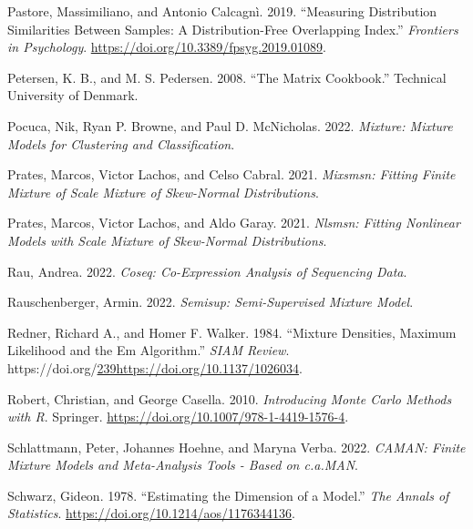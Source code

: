 \begin{CSLReferences}{1}{0}
\leavevmode{}%
Pastore, Massimiliano, and Antonio Calcagnì. 2019. {``Measuring {Distribution Similarities Between Samples}: {A Distribution-Free Overlapping Index}.''} \emph{Frontiers in Psychology}. \url{https://doi.org/10.3389/fpsyg.2019.01089}.

\leavevmode{}%
Petersen, K. B., and M. S. Pedersen. 2008. {``The Matrix Cookbook.''} Technical University of Denmark.

\leavevmode{}%
Pocuca, Nik, Ryan P. Browne, and Paul D. McNicholas. 2022. \emph{Mixture: Mixture Models for Clustering and Classification}.

\leavevmode{}%
Prates, Marcos, Victor Lachos, and Celso Cabral. 2021. \emph{Mixsmsn: Fitting Finite Mixture of Scale Mixture of Skew-Normal Distributions}.

\leavevmode{}%
Prates, Marcos, Victor Lachos, and Aldo Garay. 2021. \emph{Nlsmsn: Fitting Nonlinear Models with Scale Mixture of Skew-Normal Distributions}.

\leavevmode{}%
Rau, Andrea. 2022. \emph{Coseq: Co-Expression Analysis of Sequencing Data}.

\leavevmode{}%
Rauschenberger, Armin. 2022. \emph{Semisup: Semi-Supervised Mixture Model}.

\leavevmode{}%
Redner, Richard A., and Homer F. Walker. 1984. {``Mixture {Densities}, {Maximum Likelihood} and the {Em Algorithm}.''} \emph{SIAM Review}. https://doi.org/\url{239https://doi.org/10.1137/1026034}.

\leavevmode{}%
Robert, Christian, and George Casella. 2010. \emph{Introducing {Monte Carlo Methods} with {R}}. Springer. \url{https://doi.org/10.1007/978-1-4419-1576-4}.

\leavevmode{}%
Schlattmann, Peter, Johannes Hoehne, and Maryna Verba. 2022. \emph{CAMAN: Finite Mixture Models and Meta-Analysis Tools - Based on c.a.MAN}.

\leavevmode{}%
Schwarz, Gideon. 1978. {``Estimating the {Dimension} of a {Model}.''} \emph{The Annals of Statistics}. \url{https://doi.org/10.1214/aos/1176344136}.


\end{CSLReferences}
